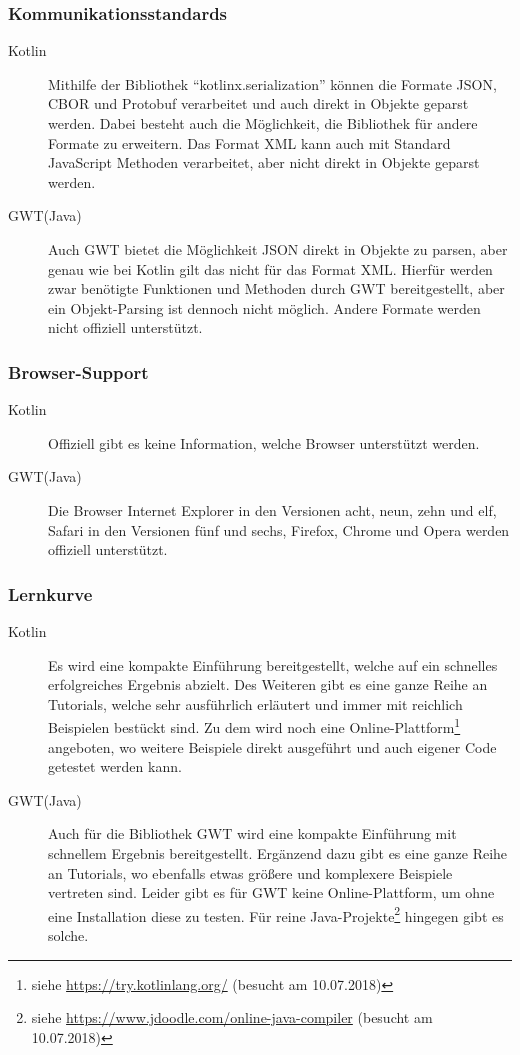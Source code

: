 \subsubsection{Kommunikationsstandards}
\begin{description}
	\item[Kotlin] Mithilfe der Bibliothek \enquote{kotlinx.serialization} können die Formate \gls{JSON}, \gls{CBOR} und \gls{Protobuf} verarbeitet und auch direkt in Objekte geparst werden.
	Dabei besteht auch die Möglichkeit, die Bibliothek für andere Formate zu erweitern. Das Format \gls{XML} kann auch mit Standard JavaScript Methoden verarbeitet, aber nicht direkt in Objekte geparst werden. \cite{kotlinxSerialization}
	\item[GWT(Java)] Auch \gls{GWT} bietet die Möglichkeit \gls{JSON} direkt in Objekte zu parsen, aber genau wie bei Kotlin gilt das nicht für das Format \gls{XML}. Hierfür werden zwar benötigte Funktionen und Methoden durch \gls{GWT} bereitgestellt, aber ein Objekt-Parsing ist dennoch nicht möglich. Andere Formate werden nicht offiziell unterstützt. \cite{gwtJSON, gwtXML}
\end{description}

\subsubsection{Browser-Support}
\begin{description}
	\item[Kotlin] Offiziell gibt es keine Information, welche Browser unterstützt werden.
	\item[GWT(Java)] Die Browser Internet Explorer in den Versionen acht, neun, zehn und elf, Safari in den Versionen fünf und sechs, Firefox, Chrome und Opera werden offiziell unterstützt. \cite{gwtGettingStarted}
\end{description}

\subsubsection{Lernkurve}
\begin{description}
	\item[Kotlin] Es wird eine kompakte Einführung bereitgestellt, welche auf ein schnelles erfolgreiches Ergebnis abzielt. Des Weiteren gibt es eine ganze Reihe an Tutorials, welche sehr ausführlich erläutert und immer mit reichlich Beispielen bestückt sind. Zu dem wird noch eine Online-Plattform\footnote{siehe \url{https://try.kotlinlang.org/} (besucht am 10.07.2018)} angeboten, wo weitere Beispiele direkt ausgeführt und auch eigener Code getestet werden kann. \cite{kotlinReference}
	\item[GWT(Java)] Auch für die Bibliothek \gls{GWT} wird eine kompakte Einführung mit schnellem Ergebnis bereitgestellt. Ergänzend dazu gibt es eine ganze Reihe an Tutorials, wo ebenfalls etwas größere und komplexere Beispiele vertreten sind. Leider gibt es für \gls{GWT} keine Online-Plattform, um ohne eine Installation diese zu testen. Für reine Java-Projekte\footnote{siehe \url{https://www.jdoodle.com/online-java-compiler} (besucht am 10.07.2018)} hingegen gibt es solche.
\end{description}


